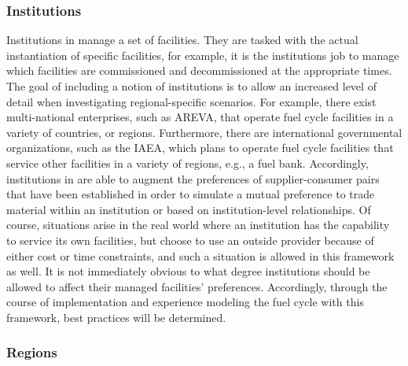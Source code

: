 \subsubsection{Institutions}

Institutions in \Cyclus manage a set of facilities. They are tasked with the
actual instantiation of specific facilities, for example, it is the institutions
job to manage which facilities are commissioned and decommissioned at the
appropriate times. The goal of including a notion of institutions is to allow an
increased level of detail when investigating regional-specific scenarios. For
example, there exist multi-national enterprises, such as AREVA, that operate
fuel cycle facilities in a variety of countries, or regions. Furthermore, there
are international governmental organizations, such as the IAEA, which plans to
operate fuel cycle facilities that service other facilities in a variety of
regions, e.g., a fuel bank. Accordingly, institutions in \Cyclus are able to
augment the preferences of supplier-consumer pairs that have been established in
order to simulate a mutual preference to trade material within an institution or
based on institution-level relationships. Of course, situations arise in the
real world where an institution has the capability to service its own
facilities, but choose to use an outside provider because of either cost or time
constraints, and such a situation is allowed in this framework as well. It is
not immediately obvious to what degree institutions should be allowed to affect
their managed facilities' preferences. Accordingly, through the course of
implementation and experience modeling the fuel cycle with this framework, best
practices will be determined.

\subsubsection{Regions}

